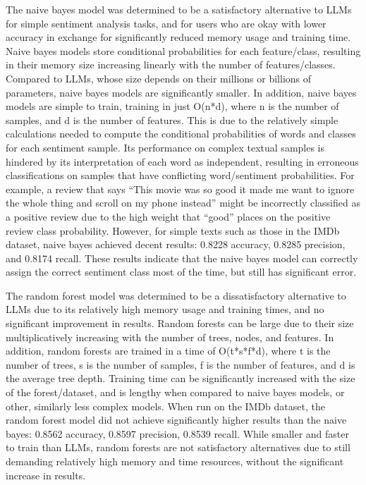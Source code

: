 \documentclass[10pt,twocolumn,letterpaper]{article}
\begin{document}
The naive bayes model was determined to be a satisfactory alternative to LLMs for simple sentiment analysis tasks, and for users who are okay with lower accuracy in exchange for significantly reduced memory usage and training time. Naive bayes models store conditional probabilities for each feature/class, resulting in their memory size increasing linearly with the number of features/classes. Compared to LLMs, whose size depends on their millions or billions of parameters, naive bayes models are significantly smaller. In addition, naive bayes models are simple to train, training in just O(n*d), where n is the number of samples, and d is the number of features. This is due to the relatively simple calculations needed to compute the conditional probabilities of words and classes for each sentiment sample. Its performance on complex textual samples is hindered by its interpretation of each word as independent, resulting in erroneous classifications on samples that have conflicting word/sentiment probabilities. For example, a review that says “This movie was so good it made me want to ignore the whole thing and scroll on my phone instead” might be incorrectly classified as a positive review due to the high weight that “good” places on the positive review class probability. However, for simple texts such as those in the IMDb dataset, naive bayes achieved decent results: 0.8228 accuracy, 0.8285 precision, and 0.8174  recall. These results indicate that the naive bayes model can correctly assign the correct sentiment class most of the time, but still has significant error. 

The random forest model was determined to be a dissatisfactory alternative to LLMs due to its relatively high memory usage and training times, and no significant improvement in results. Random forests can be large due to their size multiplicatively increasing with the number of trees, nodes, and features. In addition, random forests are trained in a time of O(t*s*f*d), where t is the number of trees, s is the number of samples, f is the number of features, and d is the average tree depth. Training time can be significantly increased with the size of the forest/dataset, and is lengthy when compared to naive bayes models, or other, similarly less complex models. When run on the IMDb dataset, the random forest model did not achieve significantly higher results than the naive bayes: 0.8562 accuracy, 0.8597 precision, 0.8539 recall. While smaller and faster to train than LLMs, random forests are not satisfactory alternatives due to still demanding relatively high memory and time resources, without the significant increase in results.
\end{document}
